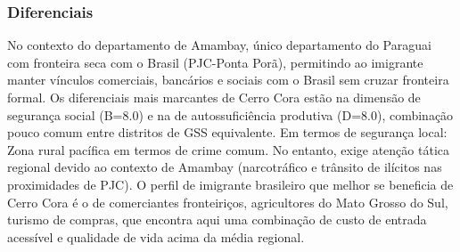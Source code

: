 \subsubsection*{Diferenciais}\label{dif-cerro-cora-1306}
No contexto do departamento de Amambay, único departamento do Paraguai com fronteira seca com o Brasil (PJC-Ponta Porã), permitindo ao imigrante manter vínculos comerciais, bancários e sociais com o Brasil sem cruzar fronteira formal. Os diferenciais mais marcantes de Cerro Cora estão na dimensão de segurança social (B=8.0) e na de autossuficiência produtiva (D=8.0), combinação pouco comum entre distritos de GSS equivalente. Em termos de segurança local: Zona rural pacífica em termos de crime comum. No entanto, exige atenção tática regional devido ao contexto de Amambay (narcotráfico e trânsito de ilícitos nas proximidades de PJC). O perfil de imigrante brasileiro que melhor se beneficia de Cerro Cora é o de comerciantes fronteiriços, agricultores do Mato Grosso do Sul, turismo de compras, que encontra aqui uma combinação de custo de entrada acessível e qualidade de vida acima da média regional.
